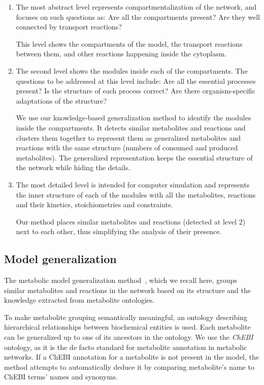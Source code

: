 \documentclass{bmcart}
\begin{document}
\begin{enumerate}
\item The most abstract level represents compartmentalization of the network, and focuses on such questions as: Are all the compartments present? Are they well connected by transport reactions?

This level shows the compartments of the model, the transport reactions between them, and other reactions happening inside the cytoplasm.

\item The second level shows the modules inside each of the compartments. The questions to be addressed at this level include: Are all the essential processes present? Is the structure of each process correct? Are there organism-specific adaptations of the structure?

We use our knowledge-based generalization method to identify the modules inside the compartments. It detects similar metabolites and reactions and clusters them together to represent them as generalized metabolites and reactions with the same structure (numbers of consumed and produced metabolites). The generalized representation keeps the essential structure of the network while hiding the details.

\item The most detailed level is intended for computer simulation and represents the inner structure of each of the modules with all the metabolites, reactions and their kinetics, stoichiometries and constraints.

Our method places similar metabolites and reactions (detected at level 2) next to each other, thus simplifying the analysis of their presence.

\end{enumerate}

\subsection*{Model generalization}
The metabolic model generalization method~\cite{Zhukova2014}, which we recall here, groups similar metabolites and reactions in the network based on its structure and the knowledge extracted from metabolite ontologies. 

To make metabolite grouping semantically meaningful, an ontology describing hierarchical relationships between biochemical entities is used. Each metabolite can be generalized up to one of its ancestors in the ontology. We use the \textit{ChEBI} ontology, as it is the de facto standard for metabolite annotation in metabolic networks. If a ChEBI annotation for a metabolite is not present in the model, the method attempts to automatically deduce it by comparing metabolite's name to ChEBI terms' names and synonyms. 
\end{document}
